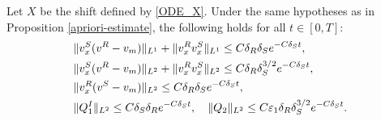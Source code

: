\documentclass[11pt,reqno]{amsart}
\begin{document}
\begin{lemma} \label{lem: interaction estimates}
    Let $X$ be the shift defined by \eqref{ODE_X}. Under the same hypotheses as in Proposition \ref{apriori-estimate}, the following holds for all $t\in [0,T]$:
    \begin{equation}
        \begin{aligned}\label{est-interaction}
            &\|v^S_x(v^R-v_m)\|_{L^1}+\|v^R_x v^S_x \|_{L^1} \le C \delta_R \delta_S e^{-C \delta_S t},\\
            &\|v^S_x(v^R-v_m)\|_{L^2}+\|v^R_x v^S_x \|_{L^2} \le C \delta_R \delta_S^{3/2} e^{-C \delta_S t},\\
            &\|v^R_x( v^S-v_m)\|_{L^2} \le C \delta_R \delta_S e^{-C \delta_S t}, \\
            &\|Q_1^I\|_{L^2} \le C \delta_S \delta_R e^{-C \delta_S t},\quad \|Q_2\|_{L^2} \le C \varepsilon_1 \delta_R \delta_S^{3/2} e^{-C \delta_S t}.
        \end{aligned}
    \end{equation}
\end{lemma}
\end{document}
